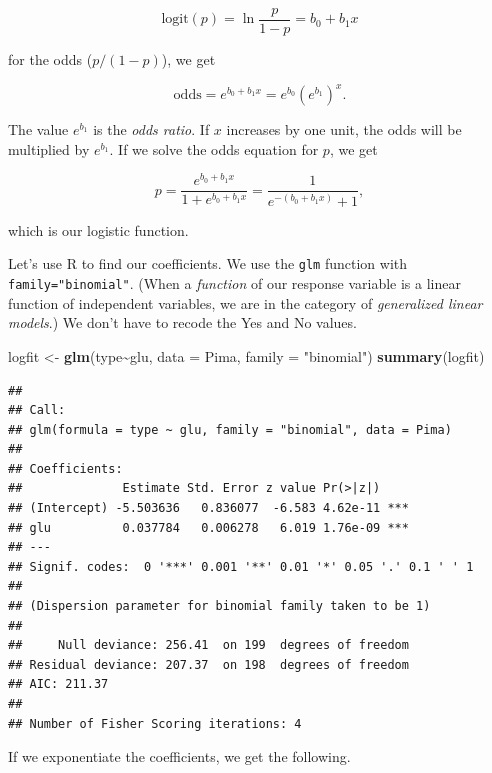 \documentclass[
]{book}
\newenvironment{Shaded}{\begin{snugshade}}{\end{snugshade}}
\newcommand{\AttributeTok}[1]{\textcolor[rgb]{0.13,0.29,0.53}{#1}}
\newcommand{\FunctionTok}[1]{\textcolor[rgb]{0.13,0.29,0.53}{\textbf{#1}}}
\newcommand{\NormalTok}[1]{#1}
\newcommand{\OtherTok}[1]{\textcolor[rgb]{0.56,0.35,0.01}{#1}}
\newcommand{\SpecialCharTok}[1]{\textcolor[rgb]{0.81,0.36,0.00}{\textbf{#1}}}
\newcommand{\StringTok}[1]{\textcolor[rgb]{0.31,0.60,0.02}{#1}}
\theoremstyle{definition}
\theoremstyle{definition}
\theoremstyle{definition}
\theoremstyle{definition}
\theoremstyle{remark}
\begin{document}
\[ \text{logit}(p)=\ln\frac{p}{1-p}=b_0+b_1x\]

for the odds (\(p/(1-p)\)), we get

\[\text{odds}=e^{b_0+b_1 x}=e^{b_0}({e^{b_1}})^{ x}.\]

The value \(e^{b_1}\) is the \emph{odds ratio}. If \(x\) increases by one unit, the odds will be multiplied by \(e^{b_1}\). If we solve the odds equation for \(p\), we get

\begin{equation}
p=\frac{e^{b_0+b_1x}}{1+e^{b_0+b_1x}}=\frac{1}{e^{-(b_0+b_1x)}+1},\label{eq:logreg}
\end{equation}

which is our logistic function.

Let's use R to find our coefficients. We use the \texttt{glm} function with \texttt{family="binomial"}. (When a \emph{function} of our response variable is a linear function of independent variables, we are in the category of \emph{generalized linear models}.) We don't have to recode the Yes and No values.

\begin{Shaded}
\begin{Highlighting}[]
\NormalTok{logfit }\OtherTok{\textless{}{-}} \FunctionTok{glm}\NormalTok{(type}\SpecialCharTok{\textasciitilde{}}\NormalTok{glu, }\AttributeTok{data =}\NormalTok{ Pima, }\AttributeTok{family =} \StringTok{"binomial"}\NormalTok{)}
\FunctionTok{summary}\NormalTok{(logfit)}
\end{Highlighting}
\end{Shaded}

\begin{verbatim}
## 
## Call:
## glm(formula = type ~ glu, family = "binomial", data = Pima)
## 
## Coefficients:
##              Estimate Std. Error z value Pr(>|z|)    
## (Intercept) -5.503636   0.836077  -6.583 4.62e-11 ***
## glu          0.037784   0.006278   6.019 1.76e-09 ***
## ---
## Signif. codes:  0 '***' 0.001 '**' 0.01 '*' 0.05 '.' 0.1 ' ' 1
## 
## (Dispersion parameter for binomial family taken to be 1)
## 
##     Null deviance: 256.41  on 199  degrees of freedom
## Residual deviance: 207.37  on 198  degrees of freedom
## AIC: 211.37
## 
## Number of Fisher Scoring iterations: 4
\end{verbatim}

If we exponentiate the coefficients, we get the following.

\begin{Shaded}
\end{Shaded}
\end{document}
